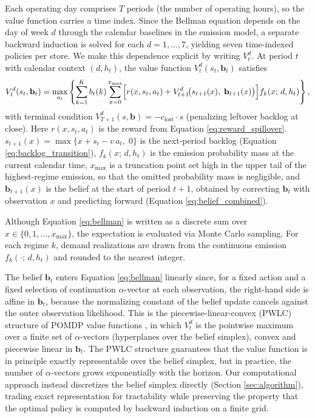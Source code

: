 \documentclass[preprint,11pt,authoryear]{elsarticle}
\newcommand{\bvec}[1]{\mathbf{#1}}
\theoremstyle{remark}
\begin{document}
Each operating day comprises $T$ periods (the number of operating hours), so the value function carries a time index. Since the Bellman equation depends on the day of week $d$ through the calendar baselines in the emission model, a separate backward induction is solved for each $d = 1, \ldots, 7$, yielding seven time-indexed policies per store. We make this dependence explicit by writing $V_t^d$. At period $t$ with calendar context $(d, h_t)$, the value function $V_t^d(s_t, \bvec{b}_t)$ satisfies
\begin{equation}
    V_t^d(s_t, \bvec{b}_t) = \max_{a_t} \left\{
        \sum_{k=1}^{K} b_t(k)
        \sum_{x=0}^{x_{\max}}
        \Bigl[ r(x, s_t, a_t) + V_{t+1}^d\!\bigl(s_{t+1}(x),\; \bvec{b}_{t+1}(x)\bigr) \Bigr]
        f_k(x;\, d, h_t)
    \right\},
    \label{eq:bellman}
\end{equation}
with terminal condition $V_{T+1}^d(s, \bvec{b}) = -c_{\mathrm{lost}} \cdot s$ (penalizing leftover backlog at close). Here $r(x, s_t, a_t)$ is the reward from Equation \eqref{eq:reward_spillover}. $s_{t+1}(x) = \max\{x + s_t - v \, a_t,\; 0\}$ is the next-period backlog (Equation \ref{eq:backlog_transition}), $f_k(x;\, d, h_t)$ is the emission probability mass at the current calendar time, $x_{\max}$ is a truncation point set high in the upper tail of the highest-regime emission, so that the omitted probability mass is negligible, and $\bvec{b}_{t+1}(x)$ is the belief at the start of period $t+1$, obtained by correcting $\bvec{b}_t$ with observation $x$ and predicting forward (Equation \ref{eq:belief_combined}).

Although Equation \eqref{eq:bellman} is written as a discrete sum over $x \in \{0, 1, \ldots, x_{\max}\}$, the expectation is evaluated via Monte Carlo sampling. For each regime $k$, demand realizations are drawn from the continuous emission $f_k(\cdot;\, d, h_t)$ and rounded to the nearest integer.

The belief $\bvec{b}_t$ enters Equation \eqref{eq:bellman} linearly since, for a fixed action and a fixed selection of continuation $\alpha$-vector at each observation, the right-hand side is affine in $\bvec{b}_t$, because the normalizing constant of the belief update cancels against the outer observation likelihood. This is the piecewise-linear-convex (PWLC) structure of POMDP value functions \citep{sondik1978optimal}, in which $V_t^d$ is the pointwise maximum over a finite set of $\alpha$-vectors (hyperplanes over the belief simplex), convex and piecewise linear in $\bvec{b}_t$. The PWLC structure guarantees that the value function is in principle exactly representable over the belief simplex, but in practice, the number of $\alpha$-vectors grows exponentially with the horizon. Our computational approach instead discretizes the belief simplex directly (Section \ref{sec:algorithm}), trading exact representation for tractability while preserving the property that the optimal policy is computed by backward induction on a finite grid.
\end{document}
